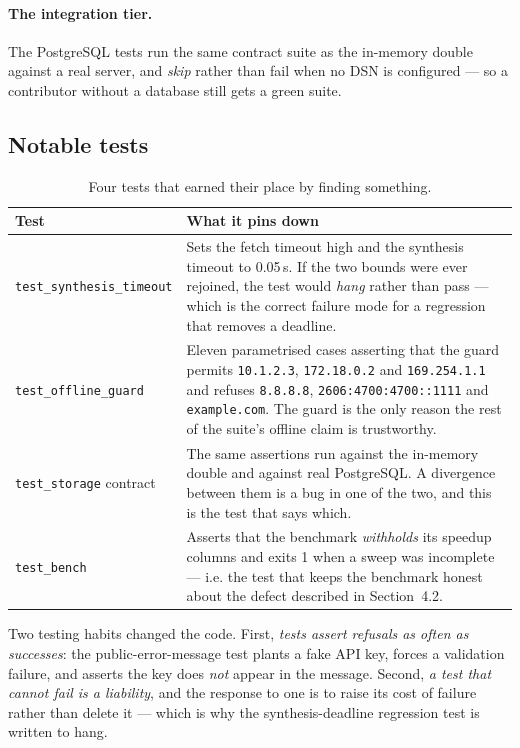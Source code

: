 \documentclass[10pt,a4paper]{article}
\begin{document}
\paragraph{The integration tier.} The PostgreSQL tests run the same contract suite as the
in-memory double against a real server, and \emph{skip} rather than fail when no DSN is
configured --- so a contributor without a database still gets a green suite.

\subsection{Notable tests}

\begin{table}[htbp]
\centering
\footnotesize
\caption{Four tests that earned their place by finding something.}
\label{tab:tests}
\begin{tabularx}{\textwidth}{@{}lX@{}}
\toprule
\textbf{Test} & \textbf{What it pins down} \\
\midrule
\texttt{test\_synthesis\_timeout} & Sets the fetch timeout high and the synthesis timeout to
    0.05\,s. If the two bounds were ever rejoined, the test would \emph{hang} rather than pass
    --- which is the correct failure mode for a regression that removes a deadline. \\
\texttt{test\_offline\_guard} & Eleven parametrised cases asserting that the guard permits
    \texttt{10.1.2.3}, \texttt{172.18.0.2} and \texttt{169.254.1.1} and refuses
    \texttt{8.8.8.8}, \texttt{2606:4700:4700::1111} and \texttt{example.com}. The guard is the
    only reason the rest of the suite's offline claim is trustworthy. \\
\texttt{test\_storage} contract & The same assertions run against the in-memory double and
    against real PostgreSQL. A divergence between them is a bug in one of the two, and this is
    the test that says which. \\
\texttt{test\_bench} & Asserts that the benchmark \emph{withholds} its speedup columns and exits
    1 when a sweep was incomplete --- i.e. the test that keeps the benchmark honest about the
    defect described in Section~4.2. \\
\bottomrule
\end{tabularx}
\end{table}

Two testing habits changed the code. First, \emph{tests assert refusals as often as successes}:
the public-error-message test plants a fake API key, forces a validation failure, and asserts the
key does \emph{not} appear in the message. Second, \emph{a test that cannot fail is a liability},
and the response to one is to raise its cost of failure rather than delete it --- which is why the
synthesis-deadline regression test is written to hang.
\end{document}
